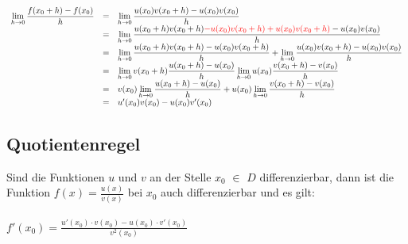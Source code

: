 \begin{Bws}
$
\begin{array}{rcl}
\lim\limits_{h \rightarrow 0} {\dfrac{f(x_{0}+h)-f(x_{0})}{h}} & = & \lim\limits_{h \rightarrow 0} {\dfrac{u(x_{0})v({x_{0}+h)-u(x_{0})v(x_{0})}}{h}}\\
&=&\lim\limits_{h \rightarrow 0} {\dfrac{u(x_{0}+h)v(x_{0}+h)\textcolor{red}{-u(x_{0})v(x_{0}+h)+u(x_{0})v(x_{0}+h)}-u(x_{0})v(x_{0}) }{h}}\\
&=&\lim\limits_{h \rightarrow 0} {\dfrac{u(x_{0}+h)v(x_{0}+h)-u(x_{0})v(x_{0}+h)}{h}} + \lim\limits_{h \rightarrow 0} {\dfrac{u(x_{0})v(x_{0}+h)-u(x_{0})v(x_{0})}{h}}\\
&=&\lim\limits_{h \rightarrow 0} {v(x_{0}+h)\dfrac{u(x_{0}+h)-u(x_{0})}{h}} \lim\limits_{h \rightarrow 0} {u(x_{0})\dfrac{v(x_{0}+h)-v(x_{0})}{h}}\\
&=& v(x_{0})\lim\limits_{h \rightarrow 0}{\dfrac{u(x_{0}+h)-u(x_{0})}{h}} +u(x_{0}) \lim\limits_{h \rightarrow 0} {\dfrac{v(x_{0}+h)-v(x_{0})}{h}}\\
&=& u'(x_{0})v(x_{0}) - u(x_{0})v'(x_{0}) 
\end{array}
$
\end{Bws}

\subsection{Quotientenregel}

Sind die Funktionen $u$ und $v$ an der Stelle $x_{0}$ $\in$ $D$ differenzierbar, dann ist die Funktion $f(x)=\frac{u(x)} {v(x)}$ bei $x_{0}$ auch differenzierbar und es gilt: \\
\\
$f'(x_{0})=\frac{u'(x_{0})\cdot v(x_{0})-u(x_{0})\cdot v'(x_{0})}{v^2(x_{0})}$\\

